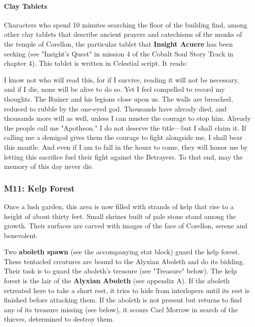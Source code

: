\documentclass[10pt,a4,twoside,twocolumn,openany,nodeprecatedcode]{dndbook}
\begin{document}
\paragraph{Clay Tablets}
Characters who spend 10 minutes searching the floor of the building find, among other clay tablets that describe ancient prayers and catechisms of the monks of the temple of Corellon, the particular tablet that \textbf{Insight Acuere} has been seeking (see "Insight's Quest" in mission 4 of the Cobalt Soul Story Track in chapter 4). This tablet is written in Celestial script. It reads:
\begin{DndReadAloud}{}
I know not who will read this, for if I survive, reading it will not be necessary, and if I die, none will be alive to do so. Yet I feel compelled to record my thoughts. The Ruiner and his legions close upon us. The walls are breached, reduced to rubble by the one-eyed god. Thousands have already died, and thousands more will as well, unless I can muster the courage to stop him.
Already the people call me "Apotheon." I do not deserve the title—but I shall claim it. If calling me a demigod gives them the courage to fight alongside me, I shall bear this mantle. And even if I am to fall in the hours to come, they will honor me by letting this sacrifice fuel their fight against the Betrayers. To that end, may the memory of this day never die.
\end{DndReadAloud}

\subsubsection{M11: Kelp Forest}
\begin{DndReadAloud}{}
Once a lush garden, this area is now filled with strands of kelp that rise to a height of about thirty feet. Small shrines built of pale stone stand among the growth. Their surfaces are carved with images of the face of Corellon, serene and benevolent.
\end{DndReadAloud}

Two \textbf{aboleth spawn} (see the accompanying stat block) guard the kelp forest. These tentacled creatures are bound to the Alyxian Aboleth and do its bidding. Their task is to guard the aboleth's treasure (see "Treasure" below).
The kelp forest is the lair of the \textbf{Alyxian Aboleth} (see appendix A). If the aboleth retreated here to take a short rest, it tries to hide from interlopers until its rest is finished before attacking them. If the aboleth is not present but returns to find any of its treasure missing (see below), it scours Cael Morrow in search of the thieves, determined to destroy them.
\end{document}
